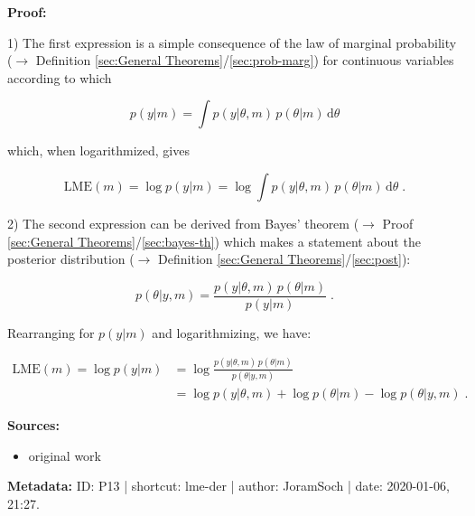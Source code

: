 \documentclass[a4paper,12pt,twoside]{book}
\begin{document}
\vspace{1em}
\textbf{Proof:}

1) The first expression is a simple consequence of the law of marginal probability ($\rightarrow$ Definition \ref{sec:General Theorems}/\ref{sec:prob-marg}) for continuous variables according to which

\begin{equation} \label{eq:lme-der-ME}
p(y|m) = \int p(y|\theta,m) \, p(\theta|m) \, \mathrm{d}\theta
\end{equation}

which, when logarithmized, gives

\begin{equation} \label{eq:lme-der-LME-marg-qed}
\mathrm{LME}(m) = \log p(y|m) = \log \int p(y|\theta,m) \, p(\theta|m) \, \mathrm{d}\theta \; .
\end{equation}

2) The second expression can be derived from Bayes' theorem ($\rightarrow$ Proof \ref{sec:General Theorems}/\ref{sec:bayes-th}) which makes a statement about the posterior distribution ($\rightarrow$ Definition \ref{sec:General Theorems}/\ref{sec:post}):

\begin{equation} \label{eq:lme-der-BT}
p(\theta|y,m) = \frac{p(y|\theta,m) \, p(\theta|m)}{p(y|m)} \; .
\end{equation}

Rearranging for $p(y \vert m)$ and logarithmizing, we have:

\begin{equation} \label{eq:lme-der-LME-bayes-qed}
\begin{split}
\mathrm{LME}(m) = \log p(y|m) & = \log \frac{p(y|\theta,m) \, p(\theta|m)}{p(\theta|y,m)} \\
&= \log p(y|\theta,m) + \log p(\theta|m) - \log p(\theta|y,m) \; .
\end{split}
\end{equation}


\vspace{1em}
\textbf{Sources:}
\begin{itemize}
\item original work\end{itemize}


\vspace{1em}
\textbf{Metadata:} ID: P13 | shortcut: lme-der | author: JoramSoch | date: 2020-01-06, 21:27.
\vspace{1em}
\end{document}
